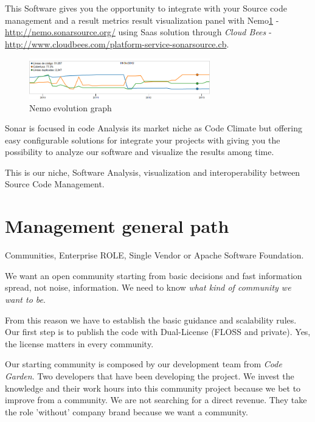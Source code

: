\documentclass[11pt]{scrartcl}
\begin{document}
\par This Software gives you the opportunity to integrate with your Source code management and a result metrics result visualization panel with Nemo\ref{nemo-evolution} - \url{http://nemo.sonarsource.org/} using Saas solution through \emph{Cloud Bees} - \url{http://www.cloudbees.com/platform-service-sonarsource.cb}.

\begin{figure}[H]
\centering
\includegraphics[width=0.7\textwidth]{nemo-evolution.png}
\caption{Nemo evolution graph}
\label{nemo-evolution}
\end{figure}

\par Sonar is focused in code Analysis its market niche as Code Climate but offering easy configurable solutions for integrate your projects with giving you the possibility to analyze our software and visualize the results among time.

\par This is our niche, Software Analysis, visualization and interoperability between Source Code Management.


\section{Management general path}
\label{sec:management-path}

\par Communities, Enterprise ROLE, Single Vendor or Apache Software Foundation.

\par We want an open community starting from basic decisions and fast information spread, not noise, information. We need to know \emph{what kind of community we want to be}.

\par From this reason we have to establish the basic guidance and scalability rules. Our first step is to publish the code with Dual-License (FLOSS and private). Yes, the license matters in every community.

\par Our starting community is composed by our development team from \emph{Code Garden}. Two developers that have been developing the project. We invest the knowledge and their work hours into this community project because we bet to improve from a community. We are not searching for a direct revenue. They take the role 'without' company brand because we want a community. 
\end{document}
